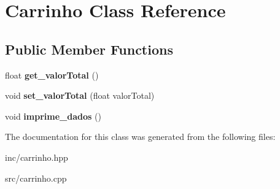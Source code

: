 \hypertarget{class_carrinho}{}\section{Carrinho Class Reference}
\label{class_carrinho}
\subsection*{Public Member Functions}
\begin{DoxyCompactItemize}
\item 
\mbox{\label{class_carrinho_a106d07a4475d8aaaf7a9e3cc11a4e30e}} 
float {\bfseries get\+\_\+valor\+Total} ()
\item 
\mbox{\label{class_carrinho_ac375bafe4b800d3433c448677fcf61be}} 
void {\bfseries set\+\_\+valor\+Total} (float valor\+Total)
\item 
\mbox{\label{class_carrinho_aeeb290a496e5345bdf3cf803e5edb43f}} 
void {\bfseries imprime\+\_\+dados} ()
\end{DoxyCompactItemize}


The documentation for this class was generated from the following files\+:\begin{DoxyCompactItemize}
\item 
inc/carrinho.\+hpp\item 
src/carrinho.\+cpp\end{DoxyCompactItemize}

